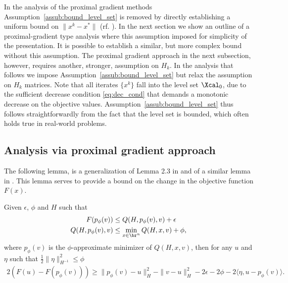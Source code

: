 \documentclass[11pt]{article}
\numberwithin{equation}{section}
\begin{document}
In the analysis of the proximal gradient methods  Assumption~\ref{assub:bound_level_set} is removed by directly establishing a uniform bound on $\|x^k - x^*\|$ (rf. \cite{OML,Schmidtetal}).  In the next section we show an outline of a proximal-gradient type analysis where this assumption imposed  for simplicity of the presentation. It is possible \cite{OML} to establish a similar, but more complex bound without this assumption.
The proximal gradient approach in the next subsection, however, requires another, stronger, assumption on $H_k$. In the analysis that follows 
we impose Assumption~\ref{assub:bound_level_set} but relax the assumption on $H_k$ matrices. 
Note that all iterates $\{x^k\}$ fall into the level set $\Xcal_0$, due to the sufficient decrease condition \eqref{eq:dec_cond} that demands a monotonic decrease on the objective values. Assumption~\ref{assub:bound_level_set} thus follows straightforwardly from the fact that the level set is bounded, which often holds true in real-world problems.


\subsection{Analysis via proximal gradient approach}\label{sec:inexact_prox}

The following lemma,  is a  generalization of Lemma 2.3 in \cite{Beck2009} and of a similar lemma in \cite{Schmidtetal}.
This lemma serves to provide a bound on the change in the objective function $F(x)$. 
\begin{lemma}
    \label{lem:subp_inexact}
    Given $\epsilon$, $\phi$ and $H$ such that
    \begin{align}
        \label{lem:BT2.3-assump-g}
        F(p_{\phi}(v)) &\leq Q(H, p_{\phi}(v),v) +\epsilon \\
        Q(H, p_{\phi}(v),v) &\leq \min_{x\in\br^n} Q(H,  x,v) + \phi, \nonumber
    \end{align}
    where $p_{\phi}(v)$ is the $\phi$-approximate minimizer of $Q(H, x,v)$, then for any $u$ and $\eta$ such that $\frac{1}{2} \| \eta \|^2_{H^{-1}} \leq \phi$
    \begin{align}
        2(F(u) - F(p_{\phi}( v))) \geq \|p_{\phi}( v)-u\|_H^2 - \|v-u\|_H^2-2\epsilon-2\phi-2 \langle \eta, u - p_{\phi}(v) \rangle. \nonumber
    \end{align}
\end{lemma}

\vskip5mm
\end{document}
